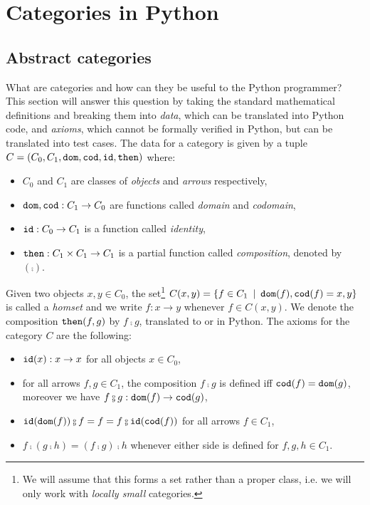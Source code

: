 
\section{Categories in Python}

\subsection{Abstract categories}

What are categories and how can they be useful to the Python programmer?
This section will answer this question by taking the standard mathematical definitions and breaking them into \emph{data}, which can be translated into Python code, and \emph{axioms}, which cannot be formally verified in Python, but can be translated into test cases.
The data for a category is given by a tuple $C = (C_0, C_1, \mathtt{dom}, \mathtt{cod}, \mathtt{id}, \mathtt{then})$ where:
\begin{itemize}
\item $C_0$ and $C_1$ are classes of \emph{objects} and \emph{arrows} respectively,
\item $\mathtt{dom}, \mathtt{cod} : C_1 \to C_0$ are functions called \emph{domain} and \emph{codomain},
\item $\mathtt{id} : C_0 \to C_1$ is a function called \emph{identity},
\item $\mathtt{then} : C_1 \times C_1 \to C_1$ is a partial function called \emph{composition}, denoted by $(\fcmp)$.
\end{itemize}
Given two objects $x, y \in C_0$, the set\footnote
{We will assume that this forms a set rather than a proper class, i.e. we will only work with \emph{locally small} categories.}
$C(x, y) = \{f \in C_1 \enspace \vert \enspace \mathtt{dom}(f), \mathtt{cod}(f) = x, y \}$ is called a \emph{homset} and we write $f : x \to y$ whenever $f \in C(x, y)$.
We denote the composition $\mathtt{then}(f, g)$ by $f \fcmp g$, translated to  or  in Python.
The axioms for the category $C$ are the following:
\begin{itemize}
\item $\mathtt{id}(x) : x \to x$ for all objects $x \in C_0$,
\item for all arrows $f, g \in C_1$, the composition $f \fcmp g$ is defined iff $\mathtt{cod}(f) = \mathtt{dom}(g)$, moreover we have $f \fcmp g : \dom(f) \to \cod(g)$,
\item $\id(\dom(f)) \fcmp f = f = f \fcmp \id(\cod(f))$ for all arrows $f \in C_1$,
\item $f \fcmp (g \fcmp h) = (f \fcmp g) \fcmp h$ whenever either side is defined for $f, g, h \in C_1$.
\end{itemize}

